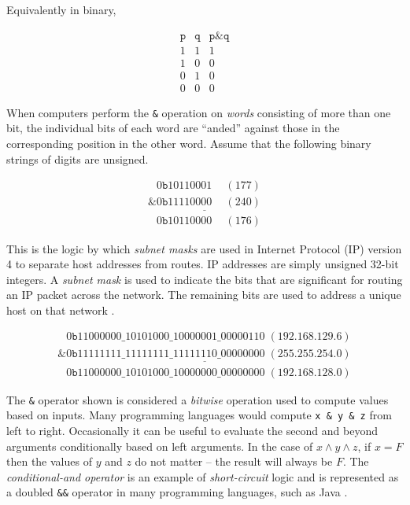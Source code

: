 \documentclass{book}
\begin{document}
Equivalently in binary,

\begin{equation*}
\begin{array}{c|c|c}
\texttt{p} & \texttt{q} & \texttt{p\&q} \\
\hline
1 & 1 & 1 \\
1 & 0 & 0 \\
0 & 1 & 0 \\
0 & 0 & 0
\end{array}
\end{equation*}

When computers perform the \texttt{\&} operation on \textit{words} consisting of more than one bit, the individual bits of each word are ``anded'' against those in the corresponding position in the other word. Assume that the following binary strings of digits are unsigned.

\begin{equation*}
\begin{array}{c}
\phantom{\texttt{\&}}0\texttt{b}10110001 \phantom{+}(177) \\
\underline{\texttt{\&}0\texttt{b}11110000 \phantom{+}(240)} \\
\phantom{\texttt{\&}}0\texttt{b}10110000 \phantom{+}(176)
\end{array}
\end{equation*}

This is the logic by which \textit{subnet masks} are used in Internet Protocol (IP) version 4 to separate host addresses from routes. IP addresses are simply unsigned 32-bit integers. A \textit{subnet mask} is used to indicate the bits that are significant for routing an IP packet across the network. The remaining bits are used to address a unique host on that network \cite{rfc791}.

\begin{equation*}
\begin{array}{c}
\phantom{\texttt{\&}}0\texttt{b}11000000\_10101000\_10000001\_00000110 \phantom{.}(192.168.129.6) \\
\underline{\texttt{\&}0\texttt{b}11111111\_11111111\_11111110\_00000000 \phantom{.}(255.255.254.0)} \\
\phantom{\texttt{\&}}0\texttt{b}11000000\_10101000\_10000000\_00000000 \phantom{.}(192.168.128.0)
\end{array}
\end{equation*}

The \texttt{\&} operator shown is considered a \textit{bitwise} operation used to compute values based on inputs. Many programming languages would compute \texttt{x \& y \& z} from left to right. Occasionally it can be useful to evaluate the second and beyond arguments conditionally based on left arguments. In the case of $x \wedge y \wedge z$, if $x = F$ then the values of $y$ and $z$ do not matter -- the result will always be $F$. The \textit{conditional-and operator} is an example of \textit{short-circuit} logic and is represented as a doubled \texttt{\&\&} operator in many programming languages, such as Java \cite{Gosling:2014:JLS:2636997}.
\end{document}
